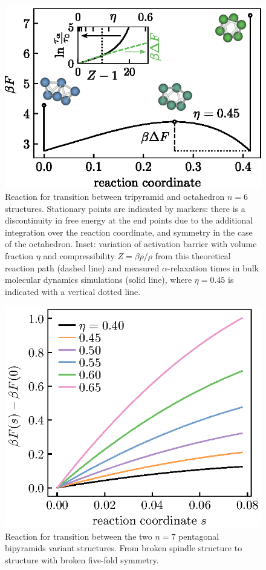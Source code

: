 \documentclass[11pt,twoside]{report}
\begin{document}
\begin{figure}
  \includegraphics[width=0.9\linewidth,outer]{n6-reaction-path}
  \caption[The simplest nontrivial reaction path in hard spheres: octahedron to tripyramid]{
    Reaction for transition between tripyramid and octahedron $n = 6$ structures.
    Stationary points are indicated by markers: there is a discontinuity in free energy at the end points due to the additional integration over the reaction coordinate, and symmetry in the case of the octahedron.
    Inset: variation of activation barrier with volume fraction $\eta$ and compressibility $Z = \beta p/\rho$ from this theoretical reaction path (dashed line) and measured $\alpha$-relaxation times in bulk molecular dynamics simulations (solid line), where $\eta = 0.45$ is indicated with a vertical dotted line.
  }
  \label{fig:reaction-path-6}
\end{figure}

\begin{figure}
  \includegraphics[width=0.9\linewidth,outer]{n7-reaction-path}
  \caption[The simplest nontrivial reaction path in hard spheres: octahedron to tripyramid]{
    Reaction for transition between the two $n = 7$ pentagonal bipyramids variant structures.
    From broken spindle structure to structure with broken five-fold symmetry.
  }
  \label{fig:reaction-path-7}
\end{figure}
\end{document}
